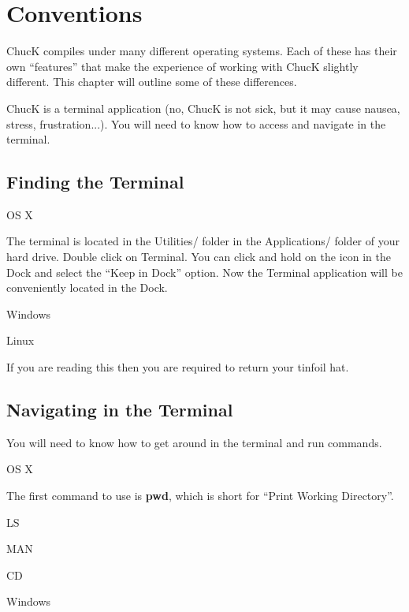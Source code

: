 \section{Conventions}

ChucK compiles under many different operating systems. Each of these has their own ``features'' that make the experience of working with ChucK slightly different. This chapter will outline some of these differences. 

ChucK is a terminal application (no, ChucK is not sick, but it may cause nausea, stress, frustration...). You will need to know how to access and navigate in the terminal.

\subsection*{Finding the Terminal}

OS X

The terminal is located in the Utilities/ folder in the Applications/ folder of your hard drive. Double click on Terminal. You can click and hold on the icon in the Dock and select the ``Keep in Dock'' option. Now the Terminal application will be conveniently located in the Dock. 

Windows


Linux

If you are reading this then you are required to return your tinfoil hat.


\subsection*{Navigating in the Terminal}

You will need to know how to get around in the terminal and run commands. 


OS X

The first command to use is {\bf pwd}, which is short for ``Print Working Directory''. 


LS 

MAN

CD


Windows

